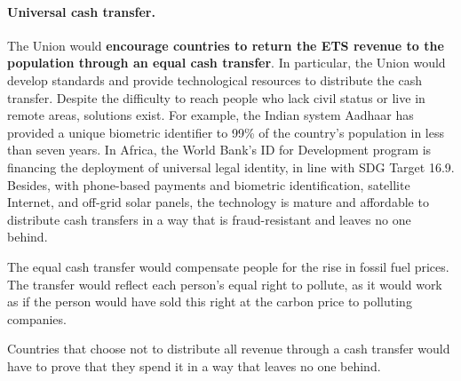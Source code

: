 \documentclass[12pt,english]{article}
\begin{document}
\paragraph{Universal cash transfer.} 
The Union would \textbf{encourage countries to return the ETS revenue to the population through an equal cash transfer}. In particular, the Union would develop standards and provide technological resources to distribute the cash transfer. Despite the difficulty to reach people who lack civil status or live in remote areas, solutions exist. For example, the Indian system Aadhaar has provided a unique biometric identifier to 99\% of the country's population in less than seven years. In Africa, the World Bank's ID for Development program is financing the deployment of universal legal identity, in line with SDG Target 16.9. Besides, with phone-based payments and biometric identification, satellite Internet, and off-grid solar panels, the technology is mature and affordable to distribute cash transfers in a way that is fraud-resistant and leaves no one behind.

The equal cash transfer would compensate people for the rise in fossil fuel prices. The transfer would reflect each person's equal right to pollute, as it would work as if the person would have sold this right at the carbon price to polluting companies.

Countries that choose not to distribute all revenue through a cash transfer would have to prove that they spend it %
in a way that leaves no one behind. %

\end{document}
